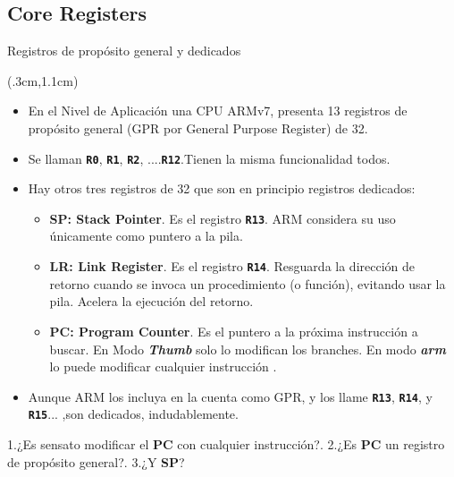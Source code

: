 \documentclass[usenames,table,dvipsnames,aspectratio=169]{beamer}
\newcommand{\arm}{\textbf{\textit{arm}}}
\newcommand{\Thumb}{\textbf{\textit{Thumb}}}
\begin{document}
\subsection{Core Registers}
\begin{frame}{Registros de propósito general y dedicados}
 \begin{textblock*}{\textwidth}(.3cm,1.1cm)
  \begin{itemize}[<+(1)->]  \justifying
   \item En el Nivel de Aplicación una CPU ARMv7, presenta 13 registros de propósito general (GPR por General Purpose Register) de \SI{32}{\bit}.
   \item Se llaman \textbf{\texttt{R0}}, \textbf{\texttt{R1}}, \texttt{\textbf{R2}}, ....\textbf{\texttt{R12}}.Tienen la misma funcionalidad todos.
   \item Hay otros tres registros de \SI{32}{\bit} que son en principio registros dedicados:
   \begin{itemize}\justifying
    \item \textbf{SP: Stack Pointer}. Es el registro \textbf{\texttt{R13}}. ARM considera su uso únicamente como puntero a la pila.
    \item \textbf{LR: Link Register}. Es el registro \texttt{\textbf{R14}}. Resguarda la dirección de retorno cuando se invoca un procedimiento (o función), evitando usar la pila. Acelera la ejecución del retorno.
    \item \textbf{PC: Program Counter}. Es el puntero a la próxima instrucción a buscar. En Modo \Thumb{} solo lo modifican los branches. En modo \arm{} lo puede modificar cualquier instrucción {\color{red}\faExclamationTriangle}.
   \end{itemize}
  \item Aunque ARM los incluya en la cuenta como GPR, y los llame \texttt{\textbf{R13}}, \textbf{\texttt{R14}}, y \textbf{\texttt{R15}}... ,son dedicados, indudablemente.
  \end{itemize}
   {{\color{blue} } \color{black} 1.¿Es sensato modificar el \textbf{PC} con cualquier instrucción?. 2.¿Es \textbf{PC} un registro de propósito general?. 3.¿Y \textbf{SP}?}
 \end{textblock*}
\end{frame}
\end{document}
